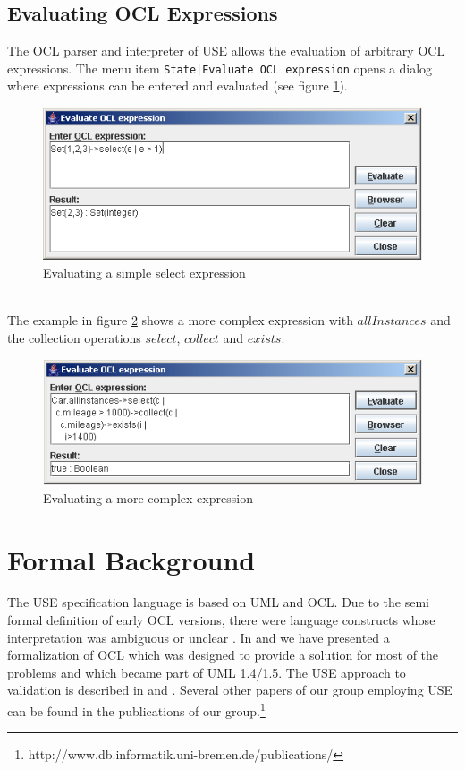 \documentclass[a4paper,titlepage,oneside,final]{scrreprt} %
\begin{document}
\subsection{Evaluating OCL Expressions}
The OCL parser and interpreter of USE allows the evaluation of arbitrary
OCL expressions. The menu item \verb+State|Evaluate OCL expression+
opens a dialog where expressions can be entered and evaluated (see figure \ref{fig:EvalSetExpr}).\\
\begin{figure}[ht]
\centering
\includegraphics[scale=0.7]{Screenshots/GUI/EvalSetExpr.png}
\caption{Evaluating a simple select expression}
\label{fig:EvalSetExpr}
\end{figure}\\
The example in figure \ref{fig:EvalSelectExpr} shows a more complex expression
with $\mathit{allInstances}$ and the collection operations $\mathit{select}$, $\mathit{collect}$
and $\mathit{exists}$.
\begin{figure}[ht]
\centering
\includegraphics[scale=0.7]{Screenshots/GUI/EvalSelectExpr.png}
\caption{Evaluating a more complex expression}
\label{fig:EvalSelectExpr}
\end{figure}
\section{Formal Background}
The USE specification language is based on UML and OCL.
Due to the semi formal definition of early OCL versions, there were language
constructs whose interpretation was ambiguous or unclear \cite{GogollaRichtersUML:1998}.
In \cite{GogollaRichtersOCL:1998} and \cite{GogollaRichters:1999}
we have presented a formalization of OCL which was designed to provide a solution
for most of the problems and which became part of UML 1.4/1.5. The USE approach to validation
is described in \cite{GogollaRichters:2000} and \cite{richters:phd}. Several other papers of our group employing USE
can be found in the publications of our group.\footnote{http://www.db.informatik.uni-bremen.de/publications/}
\end{document}
